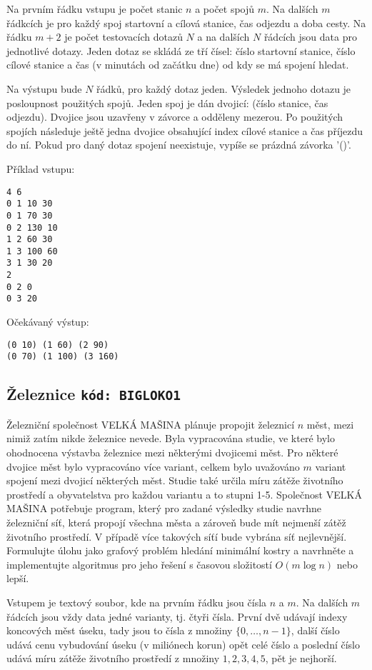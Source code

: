 \documentclass[a4paper,10pt]{article}
\begin{document}
Na prvním řádku vstupu je počet stanic $n$ a počet spojů $m$.
Na dalších $m$ řádkcích je pro každý spoj startovní a cílová stanice, čas odjezdu a 
doba cesty.  Na řádku $m+2$ je počet testovacích dotazů $N$ a na dalších $N$ řádcích jsou data pro jednotlivé dotazy. 
Jeden dotaz se skládá ze tří čísel: číslo startovní stanice, číslo cílové stanice a čas (v minutách od začátku dne) od kdy se má spojení hledat. 

Na výstupu bude $N$ řádků, pro každý dotaz jeden. Výsledek jednoho dotazu je posloupnost použitých spojů.
Jeden spoj je dán dvojicí: (číslo stanice, čas odjezdu). Dvojice jsou uzavřeny v závorce a odděleny mezerou. 
Po použitých spojích následuje ještě jedna dvojice obsahující index cílové stanice a čas příjezdu do ní.
Pokud pro daný dotaz spojení neexistuje, vypíše se prázdná závorka '()'.


Příklad vstupu:
\begin{verbatim}
4 6
0 1 10 30
0 1 70 30
0 2 130 10
1 2 60 30
1 3 100 60
3 1 30 20
2
0 2 0
0 3 20 
\end{verbatim}

Očekávaný výstup:
\begin{verbatim}
(0 10) (1 60) (2 90)
(0 70) (1 100) (3 160) 
\end{verbatim}



\subsection{Železnice \hfill{\tt kód: BIGLOKO1}}
Železniční společnost VELKÁ MAŠINA plánuje propojit železnicí $n$ měst, mezi nimiž zatím nikde železnice nevede. Byla vypracována studie, ve které bylo ohodnocena
výstavba železnice mezi některými dvojicemi měst. Pro některé dvojice měst bylo vypracováno více variant, celkem bylo uvažováno 
$m$ variant spojení mezi dvojicí některých měst. 
Studie také určila míru zátěže životního prostředí a obyvatelstva pro každou variantu a to stupni 1-5. 
Společnost VELKÁ MAŠINA potřebuje program, který pro zadané výsledky studie navrhne železniční síť, která propojí všechna města
a zároveň bude mít nejmenší zátěž životního prostředí. V případě více takových síťí bude vybrána síť nejlevnější.
Formulujte úlohu jako grafový problém hledání minimální kostry a navrhněte a implementujte algoritmus pro jeho řešení s časovou složitostí $O(m \log n)$ nebo lepší.

Vstupem je textový soubor, kde na prvním řádku jsou čísla $n$ a $m$. Na dalších $m$ řádcích jsou vždy data jedné varianty, tj. čtyři čísla. 
První dvě udávají indexy koncových měst úseku, tady jsou to čísla z množiny $\{0,\dots,n-1\}$, další číslo udává cenu vybudování úseku (v miliónech korun) 
opět celé číslo a poslední číslo udává míru zátěže životního prostředí z množiny ${1,2,3,4,5}$, pět je nejhorší. 
\end{document}

